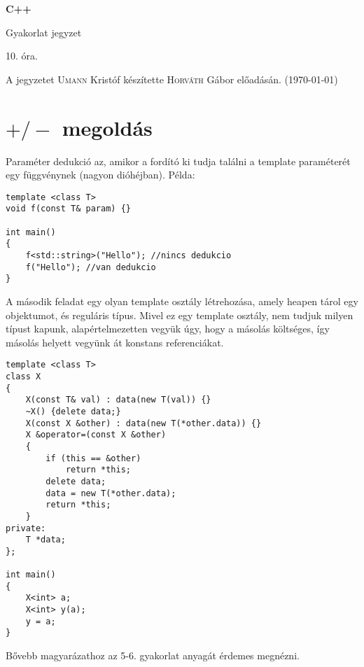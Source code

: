 \documentclass[a4paper,11.5pt]{article}
\begin{document}
	\setlength\parindent{0pt}
	\def\s{\hspace{0.2mm}\vphantom{\beta}}
	\def\Z{\mathbb{Z}}
	\def\Q{\mathbb{Q}}
	\def\R{\mathbb{R}}
	\def\C{\mathbb{C}}
	\def\N{\mathbb{N}}
	\def\Ra{\overline{\mathbb{R}}}
	
	\def\sume{\displaystyle\sum_{n=1}^{+\infty}}
	\def\sumn{\displaystyle\sum_{n=0}^{+\infty}}
	
	\def\narrow{\underset{n\rightarrow+\infty}{\longrightarrow}}
	\def\limn{\displaystyle\lim_{n\to +\infty}}
	\def\limx{\displaystyle\lim_{x\to +\infty}}
	
	\theoremstyle{definition}
	\newtheorem{theorem}{Tétel}[subsection] 
	
	\theoremstyle{definition}
	\newtheorem{definition}[theorem]{Definíció} 
	\newtheorem{example}[theorem]{Példa} 
	\newtheorem{task}[theorem]{Feladat} 
	\newtheorem{note}[theorem]{Megjegyzés}
	\begin{center}
		{\LARGE\textbf{C++}}
		
		{\Large Gyakorlat jegyzet}
		
		10. óra.
	\end{center}
	A jegyzetet \textsc{Umann} Kristóf készítette \textsc{Horváth} Gábor  előadásán. (\today)
	\section{$+/-$ megoldás}
	Paraméter dedukció az, amikor a fordító ki tudja találni a template paraméterét egy függvénynek (nagyon dióhéjban). Példa:
	\begin{lstlisting}
template <class T>
void f(const T& param) {}

int main()
{
	f<std::string>("Hello"); //nincs dedukcio
	f("Hello"); //van dedukcio
}
	\end{lstlisting}
	
	A második feladat egy olyan template osztály létrehozása, amely heapen tárol egy objektumot, és reguláris típus. Mivel ez egy template osztály, nem tudjuk milyen típust kapunk, alapértelmezetten vegyük úgy, hogy a másolás költséges, így másolás helyett vegyünk át konstans referenciákat.
	\begin{lstlisting}
template <class T>
class X
{
	X(const T& val) : data(new T(val)) {}
	~X() {delete data;}
	X(const X &other) : data(new T(*other.data)) {}
	X &operator=(const X &other)
	{
		if (this == &other)
			return *this;
		delete data;
		data = new T(*other.data);
		return *this;
	}
private:
	T *data;
};

int main()
{
	X<int> a;
	X<int> y(a);
	y = a;
}
	\end{lstlisting}
	Bővebb magyarázathoz az 5-6. gyakorlat anyagát érdemes megnézni.
	
\end{document}
